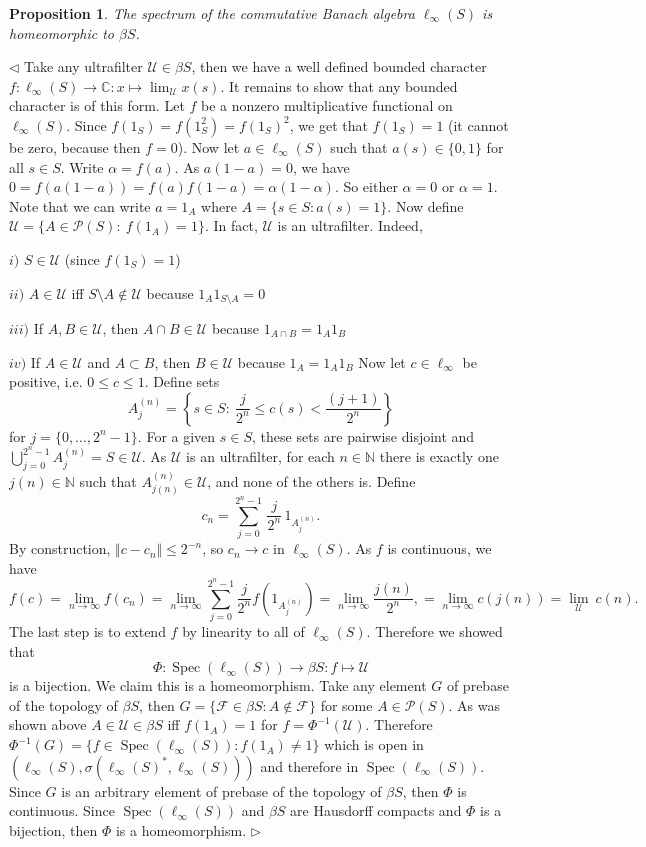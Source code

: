 \documentclass[12pt]{article}
\newtheorem{proposition}[theorem]{Proposition}
\newenvironment{proof}{\par $\triangleleft$}{$\triangleright$}
\begin{document}
\begin{proposition} The spectrum of the commutative Banach algebra $\ell_\infty(S)$ is homeomorphic to $\beta S$.
\end{proposition}
\begin{proof} Take any ultrafilter $\mathcal{U}\in\beta S$, then we have a well defined bounded character $f:\ell_\infty(S)\to\mathbb{C}:x\mapsto\lim_{\mathcal{U}}x(s)$. It remains to show that any bounded character is of this form. Let $f$ be a nonzero multiplicative functional on $\ell_\infty(S)$. Since $f(1_S)=f(1_S^2)=f(1_S)^2$, we get that $f(1_S)=1$ (it cannot be zero, because then $f=0$). Now let $a\in\ell_\infty(S)$ such that $a(s)\in\{0,1\}$ for all $s\in S$. Write $\alpha=f(a)$. As $a(1-a)=0$, we have $0=f(a(1-a))=f(a)f(1-a)=\alpha(1-\alpha)$. So either $\alpha=0$ or $\alpha=1$. Note that we can write $a=1_A$ where $A=\{s\in S: a(s)=1\}$. Now define $
\mathcal U=\{A\in\mathcal{P}(S):\ f(1_A)=1\}$. In fact, $\mathcal U$ is an ultrafilter. Indeed,

$i)$ $S\in\mathcal U$ (since $f(1_S)=1$)

$ii)$ $A\in\mathcal{U}$ iff $S\setminus A\notin\mathcal{U}$ because $1_A 1_{S\setminus A}=0$

$iii)$ If $A,B\in\mathcal{U}$, then $A\cap B\in\mathcal{U}$ because $1_{A\cap B}=1_A 1_B$

$iv)$ If $A\in\mathcal U$ and $A\subset B$, then $B\in\mathcal U$ because $1_A=1_A 1_B$
\newline
Now let $c\in\ell_\infty$ be positive, i.e. $0\leq c\leq 1$. Define sets
$$
A_j^{(n)}=\left\{s\in S:\ \frac{j}{2^n}\leq c(s)<\frac{(j+1)}{2^n}\right\}
$$
for $j=\{0,\ldots,2^n-1\}$. For a given $s\in S$, these sets are pairwise disjoint and $\bigcup_{j=0}^{2^n-1}A_j^{(n)}=S\in\mathcal{U}$.
As $\mathcal{U}$ is an ultrafilter, for each $n\in\mathbb{N}$ there is exactly one $j(n)\in\mathbb{N}$ such that $A_{j(n)}^{(n)}\in\mathcal U$, and none of the others is. Define
$$
c_n=\sum_{j=0}^{2^n-1}\,\frac{j}{2^n}\,1_{A_j^{(n)}}.
$$
By construction, $\Vert c-c_n\Vert\leq 2^{-n}$, so $c_n\to c$ in $\ell_\infty(S)$. As $f$ is continuous, we have  
$$
f(c)
=\lim_{n\to\infty} f(c_n)
=\lim_{n\to\infty}\sum_{j=0}^{2^n-1}\frac{j}{2^n}f(1_{A_j^{(n)}})
=\lim_{n\to\infty}\frac{j(n)}{2^n},
=\lim_{n\to\infty} c(j(n))
=\lim_{\mathcal U}\ c(n).
$$
The last step is to extend $f$ by linearity to all of $\ell_\infty(S)$. Therefore we showed that
$$
\Phi:\operatorname{Spec}(\ell_\infty(S))\to \beta S:f\mapsto \mathcal{U}
$$
is a bijection. We claim this is a homeomorphism. Take any element $G$ of prebase of the topology of $\beta S$, then $G=\{\mathcal{F}\in\beta S: A\notin\mathcal{F}\}$ for some $A\in\mathcal{P}(S)$. As was shown above $A\in\mathcal{U}\in\beta S$ iff $f(1_A)=1$ for $f=\Phi^{-1}(\mathcal{U})$. Therefore $\Phi^{-1}(G)=\{f\in\operatorname{Spec}(\ell_\infty(S)): f(1_A)\neq 1\}$ which is open in $(\ell_\infty(S),\sigma(\ell_\infty(S)^*,\ell_\infty(S)))$ and therefore in $\operatorname{Spec}(\ell_\infty(S))$. Since $G$ is an arbitrary element of prebase of the topology of $\beta S$, then $\Phi$ is continuous. Since $\operatorname{Spec}(\ell_\infty(S))$ and $\beta S$ are Hausdorff compacts and $\Phi$ is a bijection, then $\Phi$ is a homeomorphism.
\end{proof}
\end{document}
